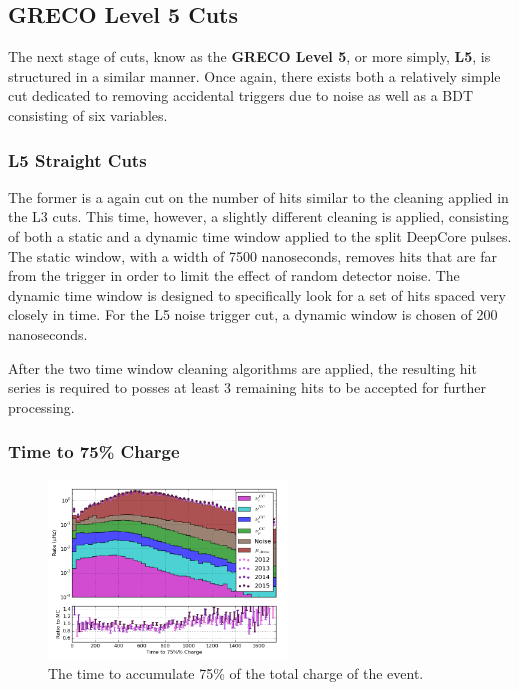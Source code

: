 \graphicspath{{chapters/greco/images/level5/}}

\subsection{GRECO Level 5 Cuts}
The next stage of cuts, know as the \textbf{GRECO Level 5}, or more simply, \textbf{L5}, is structured in a similar manner. 
Once again, there exists both a relatively simple cut dedicated to removing accidental triggers due to noise as well as a BDT consisting of six variables.

\subsubsection{L5 Straight Cuts}
The former is a again cut on the number of hits similar to the cleaning applied in the L3 cuts. 
This time, however, a slightly different cleaning is applied, consisting of both a static and a dynamic time window applied to the split DeepCore pulses.
The static window, with a width of 7500 nanoseconds, removes hits that are far from the trigger in order to limit the effect of random detector noise.
The dynamic time window is designed to specifically look for a set of hits spaced very closely in time.
For the L5 noise trigger cut, a dynamic window is chosen of 200 nanoseconds.

After the two time window cleaning algorithms are applied, the resulting hit series is required to posses at least 3 remaining hits to be accepted for further processing.

\subsubsection{Time to 75\% Charge}
\begin{figure}[h]
	\centering
		\includegraphics[width=2.5in]{Time_to_75_Charge_log.png}
		\caption[Time to 75\% Charge]{The time to accumulate 75\% of the total charge of the event.}
	\label{fig:time_to_75}
\end{figure}

